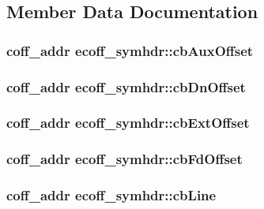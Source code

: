 \subsection{Member Data Documentation}
\hypertarget{structecoff__symhdr_a769a104ee5db5d463dedcab3cfd78a0e}{
\subsubsection[{cbAuxOffset}]{\setlength{\rightskip}{0pt plus 5cm}coff\_\-addr {\bf ecoff\_\-symhdr::cbAuxOffset}}}
\label{structecoff__symhdr_a769a104ee5db5d463dedcab3cfd78a0e}
\hypertarget{structecoff__symhdr_a6c1463b0d062503dac9f377b9b289130}{
\subsubsection[{cbDnOffset}]{\setlength{\rightskip}{0pt plus 5cm}coff\_\-addr {\bf ecoff\_\-symhdr::cbDnOffset}}}
\label{structecoff__symhdr_a6c1463b0d062503dac9f377b9b289130}
\hypertarget{structecoff__symhdr_aab99be820e48b5bfcda25cd46133cf9a}{
\subsubsection[{cbExtOffset}]{\setlength{\rightskip}{0pt plus 5cm}coff\_\-addr {\bf ecoff\_\-symhdr::cbExtOffset}}}
\label{structecoff__symhdr_aab99be820e48b5bfcda25cd46133cf9a}
\hypertarget{structecoff__symhdr_a4ed49b4e8ba269159605902ea1441b0e}{
\subsubsection[{cbFdOffset}]{\setlength{\rightskip}{0pt plus 5cm}coff\_\-addr {\bf ecoff\_\-symhdr::cbFdOffset}}}
\label{structecoff__symhdr_a4ed49b4e8ba269159605902ea1441b0e}
\hypertarget{structecoff__symhdr_abb073ea09b9427af1e9987f867b483bc}{
\subsubsection[{cbLine}]{\setlength{\rightskip}{0pt plus 5cm}coff\_\-addr {\bf ecoff\_\-symhdr::cbLine}}}

